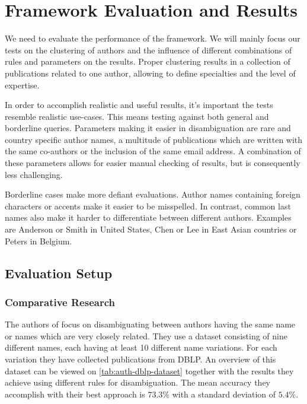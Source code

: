 \chapter{Framework Evaluation and Results}



We need to evaluate the performance of the framework. We will mainly focus our tests on the clustering of authors and the influence of different combinations of rules and parameters on the results. Proper clustering results in a collection of publications related to one author, allowing to define specialties and the level of expertise. 

In order to accomplish realistic and useful results, it's important the tests resemble realistic use-cases. This means testing against both general and borderline queries. Parameters making it easier in disambiguation are rare and country specific author names, a multitude of publications which are written with the same co-authors or the inclusion of the same email address. A combination of these parameters allows for easier manual checking of results, but is consequently less challenging. 

Borderline cases make more defiant evaluations. Author names containing foreign characters or accents make it easier to be misspelled. In contrast, common last names also make it harder to differentiate between different authors. Examples are Anderson or Smith in United States, Chen or Lee in East Asian countries or Peters in Belgium.




\section{Evaluation Setup}

\subsection{Comparative Research}

The authors of \cite{han2004two} focus on disambiguating between authors having the same name or names which are very closely related. They use a dataset consisting of nine different names, each having at least 10 different name variations. For each variation they have collected publications from DBLP. An overview of this dataset can be viewed on \autoref{tab:auth-dblp-dataset} together with the results they achieve using different rules for disambiguation. The mean accuracy they accomplish with their best approach is $73.3\%$ with a standard deviation of $5.4\%$.

